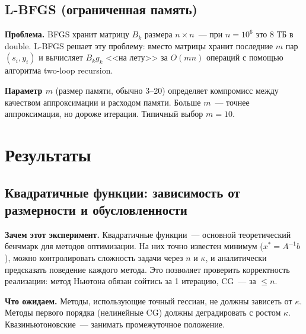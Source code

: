 \documentclass[12pt]{article}
\begin{document}
\subsection{L-BFGS (ограниченная память)}

\textbf{Проблема.} BFGS хранит матрицу $B_k$ размера $n \times n$~--- при $n = 10^6$ это 8 ТБ в double. L-BFGS решает эту проблему: вместо матрицы хранит последние $m$ пар $(s_i, y_i)$ и вычисляет $B_k g_k$ <<на лету>> за $O(mn)$ операций с помощью алгоритма two-loop recursion.

\textbf{Параметр $m$} (размер памяти, обычно 3--20) определяет компромисс между качеством аппроксимации и расходом памяти. Больше $m$~--- точнее аппроксимация, но дороже итерация. Типичный выбор $m = 10$.

\section{Результаты}

\subsection{Квадратичные функции: зависимость от размерности и обусловленности}

\textbf{Зачем этот эксперимент.} Квадратичные функции~--- основной теоретический бенчмарк для методов оптимизации. На них точно известен минимум ($x^* = A^{-1}b$), можно контролировать сложность задачи через $n$ и $\kappa$, и аналитически предсказать поведение каждого метода. Это позволяет проверить корректность реализации: метод Ньютона обязан сойтись за 1 итерацию, CG~--- за $\leq n$.

\textbf{Что ожидаем.} Методы, использующие точный гессиан, не должны зависеть от $\kappa$. Методы первого порядка (нелинейные CG) должны деградировать с ростом $\kappa$. Квазиньютоновские~--- занимать промежуточное положение.
\end{document}
